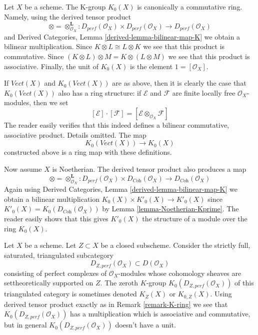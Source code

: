 \begin{remark}
\label{remark-K-ring}
Let $X$ be a scheme. The K-group $K_0(X)$ is canonically a commutative ring.
Namely, using the derived tensor product
$$
\otimes = \otimes^\mathbf{L}_{\mathcal{O}_X} :
D_{perf}(\mathcal{O}_X) \times D_{perf}(\mathcal{O}_X)
\longrightarrow
D_{perf}(\mathcal{O}_X)
$$
and Derived Categories, Lemma \ref{derived-lemma-bilinear-map-K}
we obtain a bilinear multiplication. Since $K \otimes L \cong L \otimes K$
we see that this product is commutative. Since
$(K \otimes L) \otimes M = K \otimes (L \otimes M)$
we see that this product is associative.
Finally, the unit of $K_0(X)$ is the element $1 = [\mathcal{O}_X]$.

\medskip\noindent
If $\textit{Vect}(X)$ and $K_0(\textit{Vect}(X))$ are as above, then
it is clearly the case that $K_0(\textit{Vect}(X))$ also has a
ring structure: if $\mathcal{E}$ and $\mathcal{F}$ are finite locally free
$\mathcal{O}_X$-modules, then we set
$$
[\mathcal{E}] \cdot [\mathcal{F}] =
[\mathcal{E} \otimes_{\mathcal{O}_X} \mathcal{F}]
$$
The reader easily verifies that this indeed defines a bilinear
commutative, associative product. Details omitted. The map
$$
K_0(\textit{Vect}(X)) \longrightarrow K_0(X)
$$
constructed above is a ring map with these definitions.

\medskip\noindent
Now assume $X$ is Noetherian. The derived tensor product also produces
a map
$$
\otimes = \otimes^\mathbf{L}_{\mathcal{O}_X} :
D_{perf}(\mathcal{O}_X) \times D_{\textit{Coh}}(\mathcal{O}_X)
\longrightarrow
D_{\textit{Coh}}(\mathcal{O}_X)
$$
Again using Derived Categories, Lemma \ref{derived-lemma-bilinear-map-K}
we obtain a bilinear multiplication $K_0(X) \times K'_0(X) \to K'_0(X)$
since $K'_0(X) = K_0(D_{\textit{Coh}}(\mathcal{O}_X))$ by
Lemma \ref{lemma-Noetherian-Kprime}.
The reader easily shows that this gives $K'_0(X)$ the structure
of a module over the ring $K_0(X)$.
\end{remark}

\begin{remark}
\label{remark-perf-Z}
Let $X$ be a scheme. Let $Z \subset X$ be a closed subscheme. Consider the
strictly full, saturated, triangulated subcategory
$$
D_{Z, perf}(\mathcal{O}_X) \subset D(\mathcal{O}_X)
$$
consisting of perfect complexes of $\mathcal{O}_X$-modules
whose cohomology sheaves are settheoretically supported on $Z$.
The zeroth $K$-group $K_0(D_{Z, perf}(\mathcal{O}_X))$
of this triangulated category is sometimes denoted
$K_Z(X)$ or $K_{0, Z}(X)$. Using derived tensor product exactly
as in Remark \ref{remark-K-ring} we see that $K_0(D_{Z, perf}(\mathcal{O}_X))$
has a multiplication which is associative and commutative,
but in general $K_0(D_{Z, perf}(\mathcal{O}_X))$ doesn't have a unit.
\end{remark}












